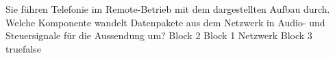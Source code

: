     {Sie führen Telefonie im Remote-Betrieb mit dem dargestellten Aufbau durch. Welche Komponente wandelt Datenpakete aus dem Netzwerk in Audio- und Steuersignale für die Aussendung um?}
    {Block 2}
    {Block 1}
    {Netzwerk}
    {Block 3}
    {true}{false}